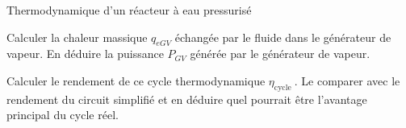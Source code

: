 \begin{exo}[PC][1][devoir]{Thermodynamique d'un réacteur à eau pressurisé}
\begin{quest}
\item Calculer la chaleur massique $q_{e G V}$ échangée par le fluide dans le générateur de vapeur. En déduire la puissance $P_{G V}$ générée par le générateur de vapeur.

\item Calculer le rendement de ce cycle thermodynamique $\eta_{\text {cycle }}$. Le comparer avec le rendement du circuit simplifié et en déduire quel pourrait être l'avantage principal du cycle réel.

\end{quest}


\end{exo}
